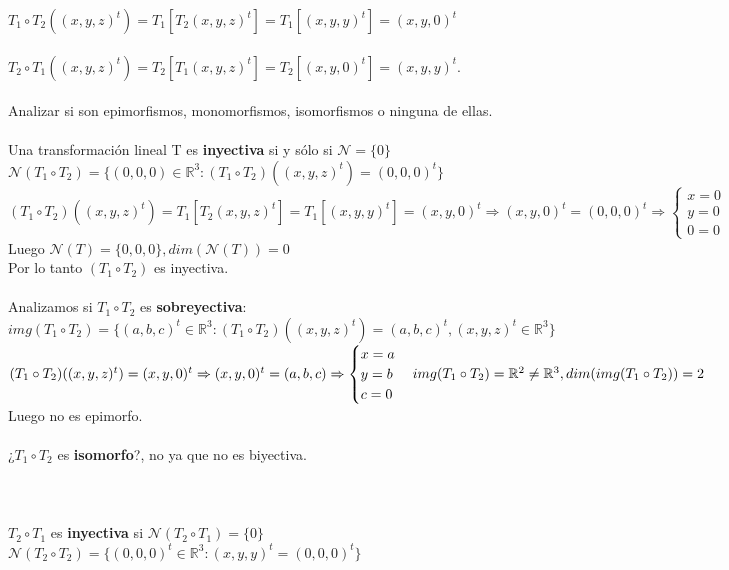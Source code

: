 \documentclass{article}
\begin{document}
$T_1 \circ T_2((x,y,z)^t) = T_1[ T_2(x,y,z)^t ] =  T_1 [ (x,y,y)^t ] = (x,y,0)^t $ \\ \\
$T_2 \circ T_1((x,y,z)^t) = T_2[ T_1(x,y,z)^t ] = T_2 [ (x,y,0)^t ] = (x,y,y)^t $. \\
\\
Analizar si son epimorfismos, monomorfismos, isomorfismos o ninguna de ellas. \\
\\
Una transformación lineal T es \textbf{inyectiva} si y sólo si $\mathcal{N} = \{ 0\}$ \\
$\mathcal{N}(T_1 \circ T_2) = \{ (0,0,0) \in \mathbb{R}^3 : (T_1 \circ T_2)((x,y,z)^t) = (0,0,0)^t \}$ \\
$(T_1 \circ T_2)((x,y,z)^t) = T_1 [ T_2 (x,y,z)^t ] = T_1 [ (x,y,y)^t] = (x,y,0)^t \Rightarrow
(x,y,0)^t = (0,0,0)^t \Rightarrow \begin{cases} x=0 \\ y=0 \\ 0=0 \end{cases}
$ \\
Luego $\mathcal{N}(T) = \{0,0,0 \}, dim(\mathcal{N}(T))=0$
\\ Por lo tanto $(T_1 \circ T_2)$ es inyectiva.
\\ \\
Analizamos si $T_1 \circ T_2$ es \textbf{sobreyectiva}: 
\\
$img(T_1 \circ T_2)=\{ (a,b,c)^t \in \mathbb{R}^3:(T_1 \circ T_2)((x,y,z)^t) = (a,b,c)^t,(x,y,z)^t
 \in \mathbb{R}^3 \}$ \\
$(T_1 \circ T_2)((x,y,z)^t) = (x,y,0)^t \Rightarrow (x,y,0)^t = (a,b,c) \Rightarrow 
\begin{cases} x=a \\ y=b \\ c=0 \end{cases} \\
img(T_1 \circ T_2) = \mathbb{R}^2 \not = \mathbb{R}^3, dim(img(T_1 \circ T_2))=2
$
\\ Luego no es epimorfo.
\\ \\
¿$T_1 \circ T_2$ es \textbf{isomorfo}?, no ya que no es biyectiva. \\
\\ \\
\\
$T_2 \circ T_1$ es \textbf{inyectiva} si $\mathcal{N}(T_2 \circ T_1) = \{ 0 \}$ \\
$\mathcal{N}(T_2 \circ T_2) = \{ (0,0,0)^t \in \mathbb{R}^3 : (x,y,y)^t = (0,0,0)^t \}$ \\
\end{document}
